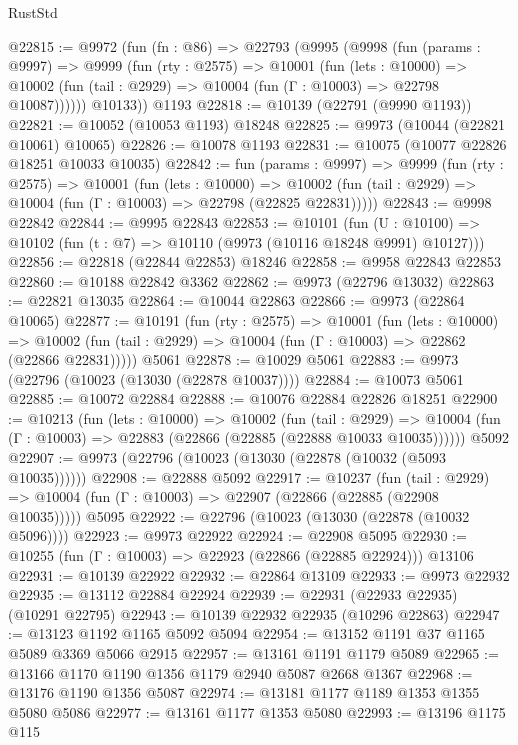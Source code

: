 \begin{lexlean}{RustStd}
\begin{coremodule}
@22815 := @9972
    (fun (fn : @86) =>
    @22793
      (@9995
        (@9998
          (fun (params : @9997) =>
          @9999
            (fun (rty : @2575) =>
            @10001
              (fun (lets : @10000) =>
              @10002 (fun (tail : @2929) => @10004 (fun (Γ : @10003) => @22798 @10087))))))
        @10133))
    @1193
@22818 := @10139 (@22791 (@9990 @1193))
@22821 := @10052 (@10053 @1193) @18248
@22825 := @9973 (@10044 (@22821 @10061) @10065)
@22826 := @10078 @1193
@22831 := @10075 (@10077 @22826 @18251 @10033 @10035)
@22842 := fun (params : @9997) =>
  @9999
    (fun (rty : @2575) =>
    @10001
      (fun (lets : @10000) =>
      @10002 (fun (tail : @2929) => @10004 (fun (Γ : @10003) => @22798 (@22825 @22831)))))
@22843 := @9998 @22842
@22844 := @9995 @22843
@22853 := @10101
    (fun (U : @10100) => @10102 (fun (t : @7) => @10110 (@9973 (@10116 @18248 @9991) @10127)))
@22856 := @22818 (@22844 @22853) @18246
@22858 := @9958 @22843 @22853
@22860 := @10188 @22842 @3362
@22862 := @9973 (@22796 @13032)
@22863 := @22821 @13035
@22864 := @10044 @22863
@22866 := @9973 (@22864 @10065)
@22877 := @10191
    (fun (rty : @2575) =>
    @10001
      (fun (lets : @10000) =>
      @10002 (fun (tail : @2929) => @10004 (fun (Γ : @10003) => @22862 (@22866 @22831)))))
    @5061
@22878 := @10029 @5061
@22883 := @9973 (@22796 (@10023 (@13030 (@22878 @10037))))
@22884 := @10073 @5061
@22885 := @10072 @22884
@22888 := @10076 @22884 @22826 @18251
@22900 := @10213
    (fun (lets : @10000) =>
    @10002
      (fun (tail : @2929) =>
      @10004 (fun (Γ : @10003) => @22883 (@22866 (@22885 (@22888 @10033 @10035))))))
    @5092
@22907 := @9973 (@22796 (@10023 (@13030 (@22878 (@10032 (@5093 @10035))))))
@22908 := @22888 @5092
@22917 := @10237
    (fun (tail : @2929) => @10004 (fun (Γ : @10003) => @22907 (@22866 (@22885 (@22908 @10035)))))
    @5095
@22922 := @22796 (@10023 (@13030 (@22878 (@10032 @5096))))
@22923 := @9973 @22922
@22924 := @22908 @5095
@22930 := @10255 (fun (Γ : @10003) => @22923 (@22866 (@22885 @22924))) @13106
@22931 := @10139 @22922
@22932 := @22864 @13109
@22933 := @9973 @22932
@22935 := @13112 @22884 @22924
@22939 := @22931 (@22933 @22935) (@10291 @22795)
@22943 := @10139 @22932 @22935 (@10296 @22863)
@22947 := @13123 @1192 @1165 @5092 @5094
@22954 := @13152 @1191 @37 @1165 @5089 @3369 @5066 @2915
@22957 := @13161 @1191 @1179 @5089
@22965 := @13166 @1170 @1190 @1356 @1179 @2940 @5087 @2668 @1367
@22968 := @13176 @1190 @1356 @5087
@22974 := @13181 @1177 @1189 @1353 @1355 @5080 @5086
@22977 := @13161 @1177 @1353 @5080
@22993 := @13196
    @1175
    @115

\end{coremodule}
\end{lexlean}
